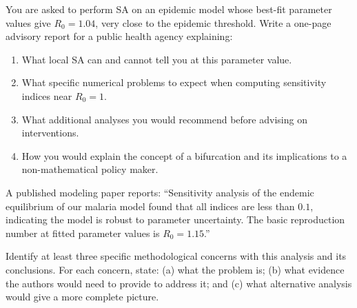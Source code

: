 \begin{exercise}[\bloom{L5}]
\label{ex:ch8:report}
You are asked to perform SA on an epidemic model whose best-fit
parameter values give $R_0 = 1.04$, very close to the epidemic threshold.
Write a one-page advisory report for a public health agency explaining:
\begin{enumerate}[label=(\alph*)]
  \item What local SA can and cannot tell you at this parameter value.
  \item What specific numerical problems to expect when computing
        sensitivity indices near $R_0 = 1$.
  \item What additional analyses you would recommend before advising
        on interventions.
  \item How you would explain the concept of a bifurcation and its
        implications to a non-mathematical policy maker.
\end{enumerate}
\end{exercise}

\begin{exercise}[\bloom{L6}]
\label{ex:ch8:critique}
A published modeling paper reports: ``Sensitivity analysis of the
endemic equilibrium of our malaria model found that all indices
are less than $0.1$, indicating the model is robust to parameter
uncertainty. The basic reproduction number at fitted parameter
values is $R_0 = 1.15$.''

Identify at least three specific methodological concerns with
this analysis and its conclusions. For each concern, state:
(a) what the problem is; (b) what evidence the authors would need
to provide to address it; and (c) what alternative analysis
would give a more complete picture.
\end{exercise}


